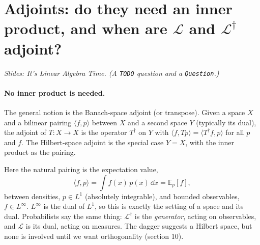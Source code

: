 \documentclass[11pt]{article}
\newcommand{\Lop}{\mathcal{L}}
\begin{document}
\section{Adjoints: do they need an inner product, and when are \texorpdfstring{$\Lop$ and $\Lop^\dagger$}{L and L-dagger} adjoint?}
\emph{Slides: It's Linear Algebra Time. (A \texttt{TODO} question and a \texttt{Question}.)}

\paragraph{No inner product is needed.} The general notion is the Banach-space adjoint (or transpose). Given a space $X$ and
a bilinear pairing $\langle f,p\rangle$ between $X$ and a second space $Y$ (typically its dual), the adjoint of
$T:X\to X$ is the operator $T^\dagger$ on $Y$ with $\langle f,Tp\rangle=\langle T^\dagger f,p\rangle$ for all $p$ and $f$.
The Hilbert-space adjoint is the special case $Y=X$, with the inner product as the pairing.

Here the natural pairing is the expectation value,
\[
  \langle f,p\rangle=\int f(x)\,p(x)\,\dd x=\mathbb E_p[f],
\]
between densities, $p\in L^1$ (absolutely integrable), and bounded observables, $f\in L^\infty$. $L^\infty$ is the dual of
$L^1$, so this is exactly the setting of a space and its dual. Probabilists say the same thing: $\Lop^\dagger$ is the
\emph{generator}, acting on observables, and $\Lop$ is its dual, acting on measures. The dagger suggests a Hilbert
space, but none is involved until we want orthogonality (section 10).
\end{document}
